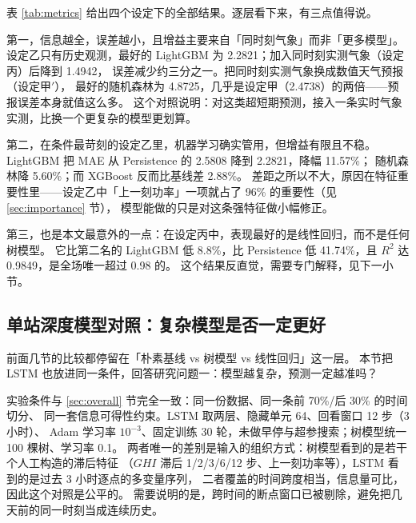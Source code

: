 \documentclass[11pt,a4paper]{ctexart}
\begin{document}
表 \ref{tab:metrics} 给出四个设定下的全部结果。逐层看下来，有三点值得说。

第一，信息越全，误差越小，且增益主要来自「同时刻气象」而非「更多模型」。
设定乙只有历史观测，最好的 LightGBM 为 2.2821；加入同时刻实测气象（设定丙）后降到 1.4942，
误差减少约三分之一。把同时刻实测气象换成数值天气预报（设定甲$'$），
最好的随机森林为 4.8725，几乎是设定甲（2.4738）的两倍——预报误差本身就值这么多。
这个对照说明：对这类超短期预测，接入一条实时气象实测，比换一个更复杂的模型更划算。

第二，在条件最苛刻的设定乙里，机器学习确实管用，但增益有限且不稳。
LightGBM 把 MAE 从 Persistence 的 2.5808 降到 2.2821，降幅 11.57\%；
随机森林降 5.60\%；而 XGBoost 反而比基线差 2.88\%。
差距之所以不大，原因在特征重要性里——设定乙中「上一刻功率」一项就占了 96\% 的重要性（见 \ref{sec:importance} 节），
模型能做的只是对这条强特征做小幅修正。

第三，也是本文最意外的一点：在设定丙中，表现最好的是线性回归，而不是任何树模型。
它比第二名的 LightGBM 低 8.8\%，比 Persistence 低 41.74\%，且 $R^2$ 达 0.9849，是全场唯一超过 0.98 的。
这个结果反直觉，需要专门解释，见下一小节。


\subsection{单站深度模型对照：复杂模型是否一定更好}
\label{sec:lstmsingle}

前面几节的比较都停留在「朴素基线 vs 树模型 vs 线性回归」这一层。
本节把 LSTM 也放进同一条件，回答研究问题一：模型越复杂，预测一定越准吗？

实验条件与 \ref{sec:overall} 节完全一致：同一份数据、同一条前 70\%/后 30\% 的时间切分、
同一套信息可得性约束。LSTM 取两层、隐藏单元 64、回看窗口 12 步（3 小时）、
Adam 学习率 $10^{-3}$、固定训练 30 轮，未做早停与超参搜索；树模型统一 100 棵树、学习率 0.1。
两者唯一的差别是输入的组织方式：树模型看到的是若干个人工构造的滞后特征
（$GHI$ 滞后 1/2/3/6/12 步、上一刻功率等），LSTM 看到的是过去 3 小时逐点的多变量序列，
二者覆盖的时间跨度相当，信息量可比，因此这个对照是公平的。
需要说明的是，跨时间的断点窗口已被剔除，避免把几天前的同一时刻当成连续历史。
\end{document}
